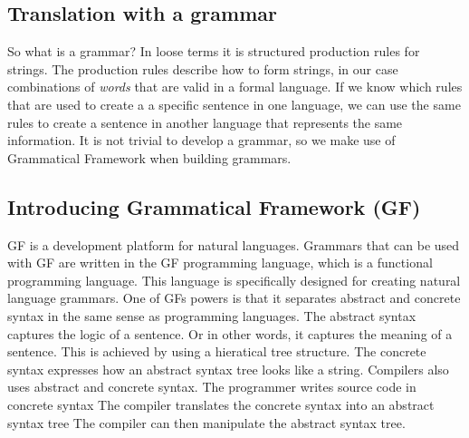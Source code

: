 \documentclass[
10pt, %
a4paper, %
oneside, %
headinclude,footinclude, %
BCOR5mm, %
]{scrartcl}
\begin{document}
\subsection{Translation with a grammar}
So what is a grammar? In loose terms it is structured production rules for strings.
\newline
\newline
The production rules describe how to form strings, in our case combinations of \emph{words} that are valid in a formal language.
\newline
\newline
If we know which rules that are used to create a a specific sentence in one language, we can use the same rules to create a sentence in another language that represents the same information.
\newline
\newline
It is not trivial to develop a grammar, so we make use of Grammatical Framework when building grammars.

\subsection{Introducing Grammatical Framework (GF)}
GF is a development platform for natural languages.
\newline
\newline
Grammars that can be used with GF are written in the GF programming language, which is a functional programming language.
\newline
\newline
This language is specifically designed for creating natural language grammars.
\newline
\newline
One of GFs powers is that it separates abstract and concrete syntax in the same sense as programming languages.
\newline
\newline
The abstract syntax captures the logic of a sentence. Or in other words, it captures the meaning of a sentence. This is achieved by using a hieratical tree structure.
\newline
\newline
The concrete syntax expresses how an abstract syntax tree looks like a string.
\newline
\newline
Compilers also uses abstract and concrete syntax.
\newline
\newline
The programmer writes source code in concrete syntax
\newline
\newline
The compiler translates the concrete syntax into an abstract syntax tree
\newline
\newline
The compiler can then manipulate the abstract syntax tree.
\end{document}
